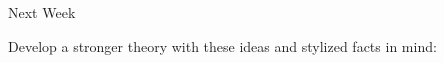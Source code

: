 \documentclass[11pt]{beamer}
\begin{document}
\begin{frame}{Next Week}

Develop a stronger theory with these ideas and stylized facts in mind:
\bigskip

\nocite{glaeser2008cities}



\end{frame}




%
%
\end{document}
